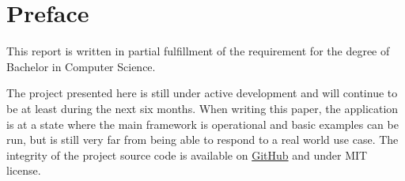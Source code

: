 \chapter{Preface}
This report is written in partial fulfillment of the requirement 
for the degree of Bachelor in Computer Science. 

The project presented here is still under active development and 
will continue to be at least during the next six months. When writing 
this paper, the application is at a state where the main framework 
is operational and basic examples can be run, but is still very far 
from being able to respond to a real world use case. The integrity 
of the project source code is available on 
\href{https://github.com/tuvistavie/scala-x-server}{GitHub} 
and under MIT license.
